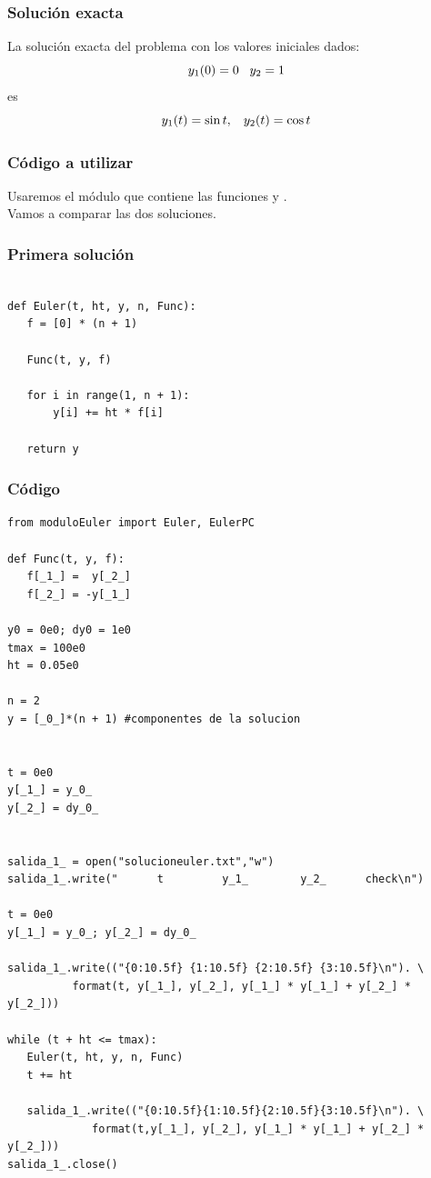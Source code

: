\begin{frame}
\frametitle{Solución exacta}
La solución exacta del problema con los valores iniciales dados:
\[ y_{1}(0) = 0 \hspace{0.3cm} y_{2} = 1 \]
es
\[ y_{1}(t) = \sin t, \hspace{0.3cm} y_{2}(t) = \cos t \]
\end{frame}
\begin{frame}
\frametitle{Código a utilizar}
Usaremos el módulo  que contiene las funciones  y .
\\
\bigskip
Vamos a comparar las dos soluciones.
\end{frame}
\begin{frame}[fragile]
\frametitle{Primera solución}
\begin{lstlisting}[caption=Método de Euler, style=FormattedNumber, basicstyle=\linespread{1.1}\ttfamily=\small, columns=fullflexible]

def Euler(t, ht, y, n, Func):
   f = [0] * (n + 1)

   Func(t, y, f)
   
   for i in range(1, n + 1):
       y[i] += ht * f[i]

   return y
\end{lstlisting}
\end{frame}
\begin{frame}
\frametitle{Código}
\begin{lstlisting}[caption=Código de Euler, style=FormattedNumber, basicstyle=\linespread{1.1}\ttfamily=\small, columns=fullflexible]
from moduloEuler import Euler, EulerPC

def Func(t, y, f):
   f[_1_] =  y[_2_]
   f[_2_] = -y[_1_]

y0 = 0e0; dy0 = 1e0
tmax = 100e0
ht = 0.05e0

n = 2
y = [_0_]*(n + 1) #componentes de la solucion


t = 0e0
y[_1_] = y_0_
y[_2_] = dy_0_


salida_1_ = open("solucioneuler.txt","w")
salida_1_.write("      t         y_1_        y_2_      check\n")

t = 0e0
y[_1_] = y_0_; y[_2_] = dy_0_

salida_1_.write(("{0:10.5f} {1:10.5f} {2:10.5f} {3:10.5f}\n"). \
          format(t, y[_1_], y[_2_], y[_1_] * y[_1_] + y[_2_] * y[_2_]))

while (t + ht <= tmax):
   Euler(t, ht, y, n, Func)
   t += ht

   salida_1_.write(("{0:10.5f}{1:10.5f}{2:10.5f}{3:10.5f}\n"). \
             format(t,y[_1_], y[_2_], y[_1_] * y[_1_] + y[_2_] * y[_2_]))
salida_1_.close()
\end{lstlisting}
\end{frame}
